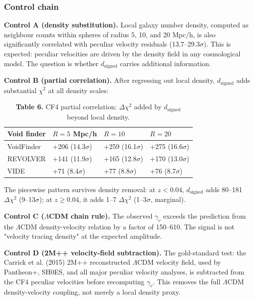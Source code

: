 \documentclass[11pt,a4paper]{article}
\begin{document}
\subsubsection{Control chain}
\textbf{Control A (density substitution).} Local galaxy number density, computed as neighbour counts within spheres of radius 5, 10, and 20 Mpc/\allowbreak{}h, is also significantly correlated with peculiar velocity residuals (13.7--29.3\(\sigma\)). This is expected: peculiar velocities are driven by the density field in any cosmological model. The question is whether \(d_\mathrm{signed}\) carries additional information.

\textbf{Control B (partial correlation).} After regressing out local density, \(d_\mathrm{signed}\) adds substantial \(\chi^2\) at all density scales:

\begin{table}[H]
\centering
\footnotesize
\caption{\textbf{Table 6.} CF4 partial correlation: \(\Delta\chi^2\) added by \(d_\mathrm{signed}\) beyond local density.}
\begin{tabularx}{\linewidth}{l>{\RaggedRight\arraybackslash}X>{\RaggedRight\arraybackslash}X>{\RaggedRight\arraybackslash}X}
\toprule
\textbf{Void finder} & \textbf{\(R = 5\) Mpc/\allowbreak{}h} & \textbf{\(R = 10\)} & \textbf{\(R = 20\)} \tabularnewline
\midrule
VoidFinder & +206 (14.3\(\sigma\)) & +259 (16.1\(\sigma\)) & +275 (16.6\(\sigma\)) \tabularnewline
REVOLVER & +141 (11.9\(\sigma\)) & +165 (12.8\(\sigma\)) & +170 (13.0\(\sigma\)) \tabularnewline
VIDE & +71 (8.4\(\sigma\)) & +77 (8.8\(\sigma\)) & +76 (8.7\(\sigma\)) \tabularnewline
\bottomrule
\end{tabularx}
\end{table}

The piecewise pattern survives density removal: at \(z < 0.04\), \(d_\mathrm{signed}\) adds 80--181 \(\Delta\chi^2\) (9--13\(\sigma\)); at \(z \geq 0.04\), it adds 1--7 \(\Delta\chi^2\) (1--3\(\sigma\), marginal).

\textbf{Control C (\(\Lambda\)CDM chain rule).} The observed \(\gamma_v\) exceeds the prediction from the \(\Lambda\)CDM density-velocity relation by a factor of 150--610. The signal is not "velocity tracing density" at the expected amplitude.

\textbf{Control D (2M++ velocity-field subtraction).} The gold-standard test: the Carrick et al. (2015) 2M++ reconstructed \(\Lambda\)CDM velocity field, used by Pantheon+, SH0ES, and all major peculiar velocity analyses, is subtracted from the CF4 peculiar velocities before recomputing \(\gamma_v\). This removes the full \(\Lambda\)CDM density-velocity coupling, not merely a local density proxy.
\end{document}

